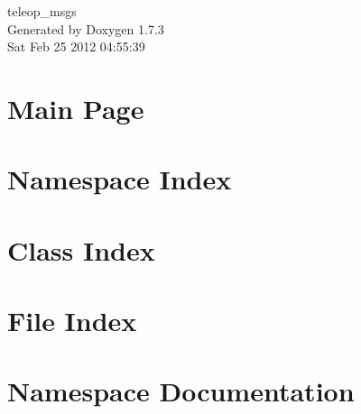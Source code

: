 \documentclass[a4paper]{book}
\begin{document}
\begin{titlepage}
\vspace*{7cm}
\begin{center}
{\Large teleop\_\-msgs }\\
\vspace*{1cm}
{\large Generated by Doxygen 1.7.3}\\
\vspace*{0.5cm}
{\small Sat Feb 25 2012 04:55:39}\\
\end{center}
\end{titlepage}
\clearemptydoublepage
{}
\tableofcontents
\clearemptydoublepage
{}
\chapter{Main Page}
\label{index}
\chapter{Namespace Index}

\chapter{Class Index}

\chapter{File Index}

\chapter{Namespace Documentation}









\end{document}
